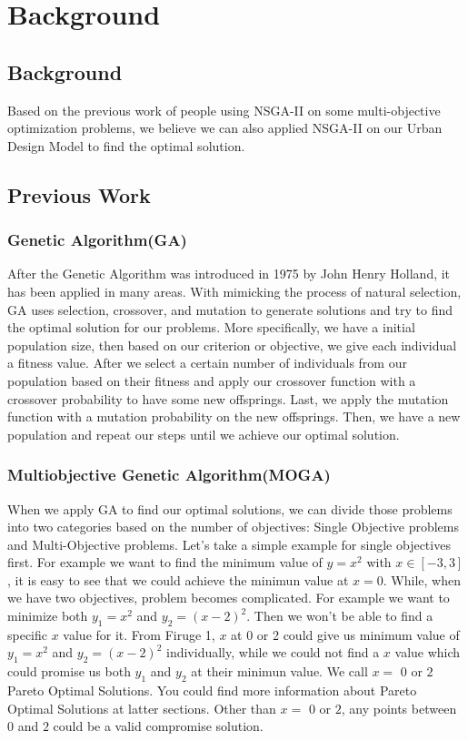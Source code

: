 \chapter{Background}
\label{chap:background}

\section{Background}
Based on the previous work of people using NSGA-II on some multi-objective optimization problems\cite{Magnier_2010_Multiobjective}, we believe we can also applied NSGA-II on our Urban Design Model to find the optimal solution. 

\section{Previous Work}

\subsection{Genetic Algorithm(GA)}
After the Genetic Algorithm was introduced in 1975 by John Henry Holland\cite{Holland_1975_Book}, it has been applied in many areas. With mimicking the process of natural selection, GA uses selection, crossover, and mutation to generate solutions and try to find the optimal solution for our problems. More specifically, we have a initial population size, then based on our criterion or objective, we give each individual a fitness value. After we select a certain number of individuals from our population based on their fitness and apply our crossover function with a crossover probability to have some new offsprings. Last, we apply the mutation function with a mutation probability on the new offsprings. Then, we have a new population and repeat our steps until we achieve our optimal solution.

\subsection{Multiobjective Genetic Algorithm(MOGA)}
When we apply GA to find our optimal solutions, we can divide those problems into two categories based on the number of objectives: Single Objective problems and Multi-Objective problems. Let's take a simple example for single objectives first. For example we want to find the minimum value of \(y=x^2\) with \(x\in [-3,3]\), it is easy to see that we could achieve the minimun value at \(x=0\). While, when we have two objectives, problem becomes complicated. For example we want to minimize both \(y_{1}=x^2\) and \(y_{2}=(x-2)^2\). Then we won't be able to find a specific \(x\) value for it. From Firuge 1, \(x\) at 0 or 2 could give us minimum value of \(y_{1}=x^2\) and \(y_{2}=(x-2)^2\) individually, while we could not find a \(x\) value which could promise us both \(y_{1}\) and \(y_{2}\) at their minimun value. We call \(x=\) \(0\) or \(2\) Pareto Optimal Solutions. You could find more information about Pareto Optimal Solutions at latter sections. Other than \(x=\) \(0\) or \(2\), any points between \(0\) and \(2\) could be a valid compromise solution. 

